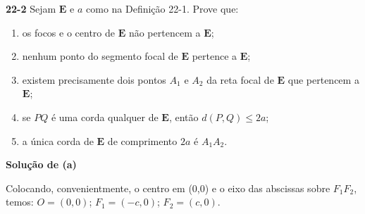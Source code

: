 \vspace{2em}

\textbf{22-2} \quad Sejam $\mathbf{E}$ e $a$ como na Definição 22-1. Prove que:
\begin{enumerate}[label=(\alph*), leftmargin=2.5em, itemsep=0.8ex, parsep=0ex, topsep=0.5ex]
    \item os focos e o centro de $\mathbf{E}$ não pertencem a $\mathbf{E}$;
    \item nenhum ponto do segmento focal de $\mathbf{E}$ pertence a $\mathbf{E}$;
    \item existem precisamente dois pontos $A_1$ e $A_2$ da reta focal de $\mathbf{E}$ que pertencem a $\mathbf{E}$;
    \item[\llap{$\rightarrow$\hspace{0.4em}}(d)] se $PQ$ é uma corda qualquer de $\mathbf{E}$, então $d(P,Q) \le 2a$;
    \item[\llap{$\rightarrow$\hspace{0.4em}}(e)] a única corda de $\mathbf{E}$ de comprimento $2a$ é $A_1A_2$.
\end{enumerate}

\textbf{Solução de (a)}

Colocando, convenientmente, o centro em (0,0) e o eixo das abscissas sobre $F_1F_2$, temos: $O = (0, 0)$; $F_1 = (-c, 0)$; $F_2 = (c, 0)$.

